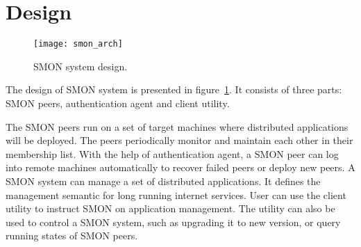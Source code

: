 \section{Design}
\label{sec:design}


\begin{figure}
\centering
\texttt{[image: smon\_arch]}
\caption{SMON system design.
}
\label{fig:smon_arch}
\end{figure}

The design of SMON system is presented in
figure~\ref{fig:smon_arch}.  It consists of three parts: SMON
peers, authentication agent and client utility.

The SMON peers run on a set of target machines where
distributed applications will be deployed. The peers
periodically monitor and maintain each other in their
membership list. 
With the help of authentication agent, a SMON peer can log
into remote machines automatically to recover failed peers
or deploy new peers. A SMON system can manage a set of
distributed applications. It defines the management semantic
for long running internet services.  User can use the client
utility to instruct SMON on application management. The
utility can also be used to control a SMON system, such as
upgrading it to new version, or query running states of SMON
peers.


